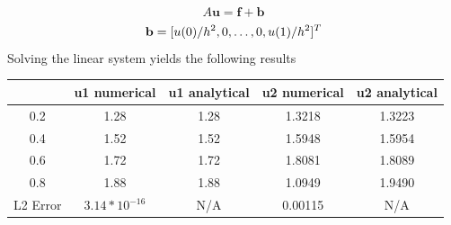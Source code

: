 \documentclass{article}
\begin{document}
\begin{equation}
    A\mathbf{u} = \mathbf{f}+\mathbf{b}
\end{equation}
\begin{equation}
    \mathbf{b} = [u(0)/h^2, 0, \dots, 0, u(1)/h^2]^T\\
\end{equation}
Solving the linear system yields the following results
\begin{table}[H]
    \centering
    \begin{tabular}{c|c|c|c|c}
        & u1 numerical & u1 analytical & u2 numerical & u2 analytical \\ \hline
        0.2 & 1.28 & 1.28 & 1.3218 & 1.3223 \\ \hline
        0.4 & 1.52 & 1.52 & 1.5948 & 1.5954 \\ \hline
        0.6 & 1.72 & 1.72 & 1.8081 & 1.8089 \\ \hline
        0.8 & 1.88 & 1.88 & 1.0949 & 1.9490 \\ \hline
        L2 Error& $3.14 * 10^{-16}$ & N/A &0.00115 & N/A
        
    \end{tabular}
\end{table}
\end{document}
